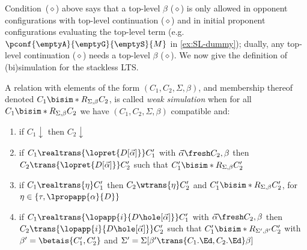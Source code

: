 Condition~($\diamond$) above says that a top-level $\beta$ ($\diamond$) is only allowed in opponent configurations with top-level continuation ($\diamond$) and in initial proponent configurations evaluating the top-level term (e.g.\ $\pconf{\emptyA}{\emptyG}{\emptyS}{M}$ in \cref{ex:SL-dummy}); dually, any top-level continuation ($\diamond$) needs a top-level $\beta$ ($\diamond$).
We now give the definition of (bi)simulation for the stackless LTS.

\begin{definition}\label{def:SLbisim}
  A relation  with elements of the form $(C_1,C_2,\Sigma,\beta)$, and membership thereof denoted $C_1 \bisim*{R}_{\Sigma,\beta} C_2$, is called 
  \emph{weak simulation} when
  for all $C_1 \bisim*{R}_{\Sigma,\beta} C_2$ we have $(C_1,C_2,\Sigma,\beta)$ compatible
 and:
  \begin{enumerate}
    \item[0.]
      if $C_1\downarrow$
      then $C_2\downarrow$
    \item
      if $C_1 \realtrans{\lopret{D[\vec\alpha]}} C_1'$ with $\vec\alpha\fresh C_2,\beta$ 
      then $C_2 \trans{\lopret{D[\vec\alpha]}} C_2'$ such that
      $C_1' \bisim*{R}_{\Sigma,\beta} C_2'$
    \item
      if $C_1 \realtrans{\eta} C_1'$
      then $C_2 \wtrans{\eta} C_2'$ and
      $C_1' \bisim*{R}_{\Sigma,\beta} C_2'$, for $\eta\in\{\tau,\lpropapp{\alpha}{D}\}$
    \item
      if $C_1 \realtrans{\lopapp{i}{D\hole[\vec \alpha]}}  C_1'$ with
 $\vec\alpha\fresh C_2,\beta$ then $C_2 \trans{\lopapp{i}{D\hole[\vec\alpha]}}  C_2'$
such that      $C_1' \bisim*{R}_{\Sigma',\beta'} C_2'$
      with $\beta' = \betais{C_1',C_2'}$ and $\Sigma' = \Sigma[\beta'\trans{C_1.\Ed, C_2.\Ed}\beta]$

\end{enumerate}
\end{definition}

